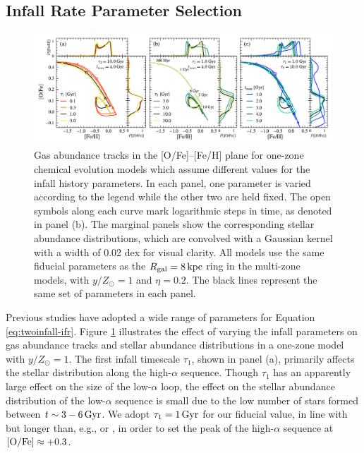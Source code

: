 \documentclass[twocolumn,twocolappendix,linenumbers]{aastex631}
\newcommand{\mathOFe}{{\rm [O/Fe]}}
\newcommand{\yZ}[1]{$y/Z_\odot=#1$}
\newcommand{\kpc}{\,{\rm kpc}}
\begin{document}
\subsection{Infall Rate Parameter Selection}
\label{sec:parameter-selection}

\begin{figure}
    \centering
    \includegraphics[width=\textwidth]{figures/infall_parameters.pdf}
    \caption{Gas abundance tracks in the [O/Fe]--[Fe/H] plane for one-zone chemical evolution models which assume different values for the infall history parameters. In each panel, one parameter is varied according to the legend while the other two are held fixed. The open symbols along each curve mark logarithmic steps in time, as denoted in panel (b). The marginal panels show the corresponding stellar abundance distributions, which are convolved with a Gaussian kernel with a width of 0.02 dex for visual clarity. All models use the same fiducial parameters as the $R_{\rm gal}=8\kpc$ ring in the multi-zone models, with \yZ{1} and $\eta=0.2$. The black lines represent the same set of parameters in each panel.}
    \label{fig:twoinfall-parameters}
\end{figure}

Previous studies have adopted a wide range of parameters for Equation \ref{eq:twoinfall-ifr}. Figure \ref{fig:twoinfall-parameters} illustrates the effect of varying the infall parameters on gas abundance tracks and stellar abundance distributions in a one-zone model with \yZ{1}. The first infall timescale $\tau_1$, shown in panel (a), primarily affects the stellar distribution along the high-$\alpha$ sequence. Though $\tau_1$ has an apparently large effect on the size of the low-$\alpha$ loop, the effect on the stellar abundance distribution of the low-$\alpha$ sequence is small due to the low number of stars formed between $t\sim3-6\,{\rm Gyr}$. We adopt $\tau_1=1\,{\rm Gyr}$ for our fiducial value, in line with \citet{spitoni_galactic_2020} but longer than, e.g., \citet{nissen_high-precision_2020} or \citet{spitoni_apogee_2021}, in order to set the peak of the high-$\alpha$ sequence at $\mathOFe\approx+0.3$. 
\end{document}
